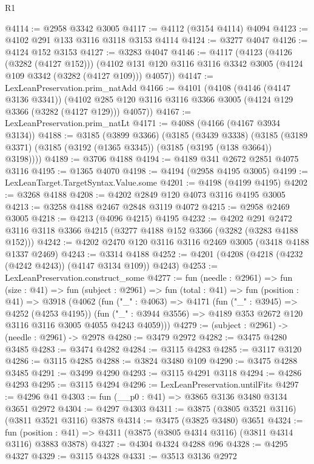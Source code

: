 \begin{lexlean}{R1}
\begin{coremodule}
@4114 := @2958 @3342 @3005
@4117 := @4112 (@3154 @4114) @4094
@4123 := @4102 @291 @133 @3116 @3118 @3153 @4114
@4124 := @3277 @4047
@4126 := @4124 @152 @3153
@4127 := @3283 @4047
@4146 := @4117
    (@4123
      (@4126 (@3282 (@4127 @152)))
      (@4102 @131 @120 @3116 @3116 @3342 @3005 (@4124 @109 @3342 (@3282 (@4127 @109))) @4057))
@4147 := LexLeanPreservation.prim_natAdd
@4166 := @4101
    (@4108
      (@4146 (@4147 @3136 @3341))
      (@4102 @285 @120 @3116 @3116 @3366 @3005 (@4124 @129 @3366 (@3282 (@4127 @129))) @4057))
@4167 := LexLeanPreservation.prim_natLt
@4171 := @4088 (@4166 (@4167 @3934 @3134))
@4188 := @3185
    (@3899 @3366)
    (@3185
      (@3439 @3338)
      (@3185 (@3189 @3371) (@3185 (@3192 (@1365 @3345)) (@3185 (@3195 (@138 @3664)) @3198))))
@4189 := @3706 @4188
@4194 := @4189 @341 @2672 @2851 @4075 @3116
@4195 := @1365 @4070
@4198 := @4194 (@2958 @4195 @3005)
@4199 := LexLeanTarget.TargetSyntax.Value.some
@4201 := @4198 (@4199 @4195)
@4202 := @3268 @4188
@4208 := @4202 @2849 @120 @4073 @3116 @4195 @3005
@4213 := @3258 @4188 @2467 @2848 @3119 @4072
@4215 := @2958 @2469 @3005
@4218 := @4213 (@4096 @4215) @4195
@4232 := @4202
    @291
    @2472
    @3116
    @3118
    @3366
    @4215
    (@3277 @4188 @152 @3366 (@3282 (@3283 @4188 @152)))
@4242 := @4202 @2470 @120 @3116 @3116 @2469 @3005 (@3418 @4188 @1337 @2469)
@4243 := @3314 @4188
@4252 := @4201 (@4208 (@4218 (@4232 (@4242 @4243)) (@4147 @3134 @109)) @4243)
@4253 := LexLeanPreservation.construct_some
@4277 := fun (needle : @2961) =>
  fun (size : @41) =>
  fun (subject : @2961) =>
  fun (total : @41) =>
  fun (position : @41) =>
  @3918
    (@4062
      (fun ("_" : @4063) =>
      @4171
        (fun ("_" : @3945) => @4252 (@4253 @4195))
        (fun ("_" : @3944 @3556) => @4189 @353 @2672 @120 @3116 @3116 @3005 @4055 @4243 @4059)))
@4279 := (subject : @2961) -> (needle : @2961) -> @2978
@4280 := @3479 @2972
@4282 := @3475 @4280 @3485
@4283 := @3474 @4282
@4284 := @3115 @4283
@4285 := @3117 @3120
@4286 := @3115 @4285
@4288 := @3824 @3480 @109
@4290 := @3475 @4288 @3485
@4291 := @3499 @4290
@4293 := @3115 @4291 @3118
@4294 := @4286 @4293
@4295 := @3115 @4294
@4296 := LexLeanPreservation.untilFits
@4297 := @4296 @41
@4303 := fun (__p0 : @41) => @3865 @3136 @3480 @3134 @3651 @2972
@4304 := @4297 @4303
@4311 := @3875 (@3805 @3521 @3116) (@3811 @3521 @3116) @3878
@4314 := @3475 (@3825 @3480) @3651
@4324 := fun (position : @41) => @4311 (@3875 (@3805 @4314 @3116) (@3811 @4314 @3116) @3883 @3878)
@4327 := @4304 @4324 @4288 @96
@4328 := @4295 @4327
@4329 := @3115 @4328
@4331 := @3513 @3136 @2972

\end{coremodule}
\end{lexlean}
